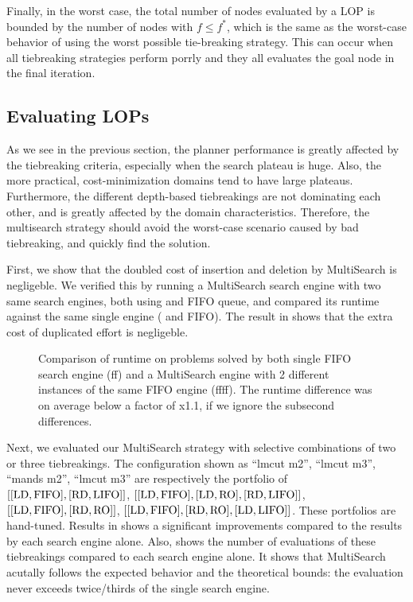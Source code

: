 Finally, in the worst case, the total number of nodes evaluated by a LOP is bounded by the number of nodes with $f \leq f^*$, which is the same as the worst-case behavior of \astar using the worst possible tie-breaking strategy.
This can occur  when all tiebreaking
strategies perform porrly  and they all evaluates the goal node in the
final iteration.

\subsection{Evaluating LOPs}

As we see in the previous section, the planner performance is greatly
affected by the tiebreaking criteria, especially when the search plateau
is huge.
% 
Also, the more practical, cost-minimization domains tend to have large plateaus.
% 
Furthermore, the different depth-based tiebreakings are not dominating
each other, and is greatly affected by the domain characteristics.
% 
Therefore, the multisearch strategy should avoid the
worst-case scenario caused by bad tiebreaking, and quickly find the solution.

First, we show that the doubled cost of insertion and deletion by
MultiSearch is negligeble.  We verified this by running a MultiSearch
search engine with two same search engines, both using \lmcut and FIFO
queue, and compared its runtime against the same single engine (\lmcut
and FIFO). The result in  shows that the extra cost of
duplicated effort is negligeble.

\begin{figure}[htb]
 \centering
 \caption{Comparison of runtime on problems solved by both single FIFO search engine (ff) and a MultiSearch engine with 2 different instances of the same FIFO engine (ffff). The runtime difference was on average below a factor of x1.1, if we ignore the subsecond differences.}
 \label{ffff}
\end{figure}

Next, we evaluated our MultiSearch
strategy with selective combinations of two or three tiebreakings.
The configuration shown as ``lmcut m2'', ``lmcut m3'', ``mands m2'',
``lmcut m3'' are respectively the portfolio of
$[[\mbox{LD},\mbox{FIFO}], [\mbox{RD},\mbox{LIFO}]]$, $[[\mbox{LD},\mbox{FIFO}], [\mbox{LD},\mbox{RO}], [\mbox{RD},\mbox{LIFO}]]$,
$[[\mbox{LD},\mbox{FIFO}],[\mbox{RD},\mbox{RO}]]$, $[[\mbox{LD},\mbox{FIFO}],[\mbox{RD},\mbox{RO}],[\mbox{LD},\mbox{LIFO}]]$. These
portfolios are hand-tuned.
Results in 
shows a significant improvements compared to the results by each search
engine alone.
% 
Also,  shows the number of evaluations of these
tiebreakings compared to each search engine alone.  It shows that
MultiSearch acutally follows the expected behavior and the theoretical
bounds: the evaluation never exceeds twice/thirds of the single
search engine.

